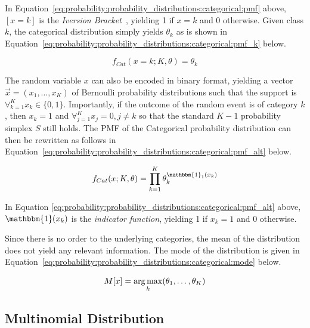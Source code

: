 \noindent
In Equation~\eqref{eq:probability:probability_distributions:categorical:pmf} above, $[x = k]$ is the \textit{Iversion Bracket}~\cite{ref:iverson:1962}, yielding 1 if $x = k$ and 0 otherwise. Given class $k$, the categorical distribution simply yields $\theta_{k}$ as is shown in Equation~\eqref{eq:probability:probability_distributions:categorical:pmf_k} below.

\begin{equation}
      \label{eq:probability:probability_distributions:categorical:pmf_k}
      f_{Cat}(x=k; K, \theta) = \theta_{k}
\end{equation}

\noindent
The random variable $x$ can also be encoded in binary format, yielding a vector $\vec{x} = (x_{1}, \dots, x_{K})$ of Bernoulli probability distributions such that the support is $\forall_{k=1}^{K} x_{k} \in \{0, 1\}$. Importantly, if the outcome of the random event is of category $k$, then $x_{k} = 1$ and $\forall_{j=1}^{K} x_{j} = 0, j \neq k$ so that the standard $K-1$ probability simplex $S$ still holds. The \acs{PMF} of the Categorical probability distribution can then be rewritten as follows in Equation~\eqref{eq:probability:probability_distributions:categorical:pmf_alt} below.

\begin{equation}
      \label{eq:probability:probability_distributions:categorical:pmf_alt}
      f_{Cat}(x; K, \theta) = \prod_{k=1}^{K}\theta_{k}^{\mathbbm{1}_{1}(x_{k})}
\end{equation}

\noindent
In Equation \ref{eq:probability:probability_distributions:categorical:pmf_alt} above, $\mathbbm{1}(x_{k})$ is the \textit{indicator function}, yielding 1 if $x_{k} = 1$ and 0 otherwise.

Since there is no order to the underlying categories, the mean of the distribution does not yield any relevant information. The mode of the distribution is given in Equation~\eqref{eq:probability:probability_distributions:categorical:mode} below.

\begin{equation}
      \label{eq:probability:probability_distributions:categorical:mode}
      M[x] = \operatorname*{arg\,max}_{k}(\theta_{1}, \dots, \theta_{K})
\end{equation}


\subsection{Multinomial Distribution}
\label{sec:probability:probability_distributions:multinomial}

